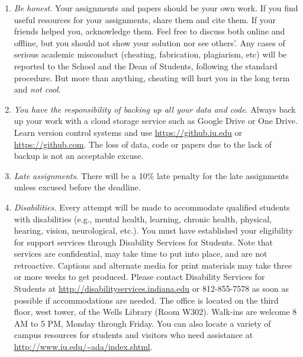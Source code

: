 \documentclass[11pt,article,oneside]{memoir} %
\begin{document}
\begin{enumerate}



\item \emph{Be honest.} Your assignments and papers should be your own work.  
If you find useful resources for your assignments, share them and cite them. 
If your friends helped you, acknowledge them. 
Feel free to discuss both online and offline, but you should not show your solution nor see others'.  
Any cases of serious academic misconduct (cheating, fabrication, plagiarism, etc) will be reported to the School and the Dean of Students, following the standard procedure. 
But more than anything, cheating will hurt you in the long term and \emph{not cool}.

\item \emph{You have the responsibility of backing up all your data and code}.
Always back up your work with a cloud storage service such as Google Drive or One Drive. 
Learn version control systems and use \url{https://github.iu.edu} or \url{https://github.com}. 
The loss of data, code or papers due to the lack of backup is not an acceptable excuse.

\item \emph{Late assignments}. There will be a 10\% late penalty for the late assignments unless excused before the deadline. 

\item \emph{Disabilities.} Every attempt will be made to accommodate qualified students with disabilities (e.g., mental health, learning, chronic health, physical, hearing, vision, neurological, etc.). 
You must have established your eligibility for support services through Disability Services for Students. 
Note that services are confidential, may take time to put into place, and are not retroactive.  
Captions and alternate media for print materials may take three or more weeks to get produced. 
Please contact Disability Services for Students at \url{http://disabilityservices.indiana.edu} or 812-855-7578 as soon as possible if accommodations are needed. 
The office is located on the third floor, west tower, of the Wells Library (Room W302). 
Walk-ins are welcome 8 AM to 5 PM, Monday through Friday. 
You can also locate a variety of campus resources for students and visitors who need assistance at \url{http://www.iu.edu/~ada/index.shtml}.


\end{enumerate}
\end{document}
